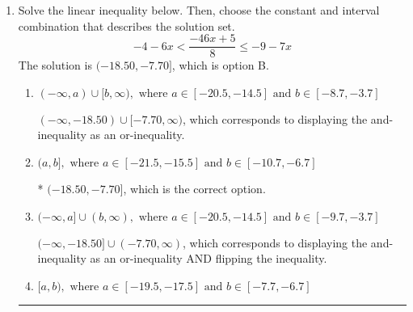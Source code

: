\documentclass{extbook}[14pt]
\newcommand{\litem}[1]{\item #1

\rule{\textwidth}{0.4pt}}
\begin{document}
\begin{enumerate}
{\begin{enumerate}[label=\Alph*.]
 $[15.0, \infty)$, which corresponds to switching the direction of the interval. You likely did this if you did not flip the inequality when dividing by a negative!
\item \( (-\infty, a], \text{ where } a \in [15, 17] \)

* $(-\infty, 15.0]$, which is the correct option.
\item \( [a, \infty), \text{ where } a \in [-15, -14] \)

 $[-15.0, \infty)$, which corresponds to switching the direction of the interval AND negating the endpoint. You likely did this if you did not flip the inequality when dividing by a negative as well as not moving values over to a side properly.
\item \( \text{None of the above}. \)

You may have chosen this if you thought the inequality did not match the ends of the intervals.
\end{enumerate}

\textbf{General Comment:} Remember that less/greater than or equal to includes the endpoint, while less/greater do not. Also, remember that you need to flip the inequality when you multiply or divide by a negative.
}
\litem{
Solve the linear inequality below. Then, choose the constant and interval combination that describes the solution set.
\[ -4 - 6 x < \frac{-46 x + 5}{8} \leq -9 - 7 x \]The solution is \( (-18.50, -7.70] \), which is option B.\begin{enumerate}[label=\Alph*.]
\item \( (-\infty, a) \cup [b, \infty), \text{ where } a \in [-20.5, -14.5] \text{ and } b \in [-8.7, -3.7] \)

$(-\infty, -18.50) \cup [-7.70, \infty)$, which corresponds to displaying the and-inequality as an or-inequality.
\item \( (a, b], \text{ where } a \in [-21.5, -15.5] \text{ and } b \in [-10.7, -6.7] \)

* $(-18.50, -7.70]$, which is the correct option.
\item \( (-\infty, a] \cup (b, \infty), \text{ where } a \in [-20.5, -14.5] \text{ and } b \in [-9.7, -3.7] \)

$(-\infty, -18.50] \cup (-7.70, \infty)$, which corresponds to displaying the and-inequality as an or-inequality AND flipping the inequality.
\item \( [a, b), \text{ where } a \in [-19.5, -17.5] \text{ and } b \in [-7.7, -6.7] \)


\end{enumerate}}
\end{enumerate}
\end{document}
